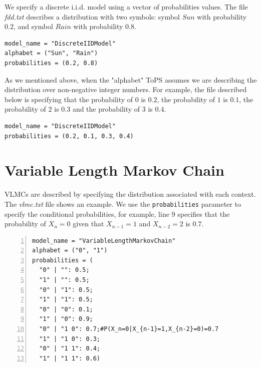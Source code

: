We specify a discrete i.i.d. model using a vector of probabilities values. The file \textit{fdd.txt} describes a distribution with two symbols: symbol $Sun$ with probability $0.2$, and symbol $Rain$ with probability $0.8$.

\begin{Verbatim}[frame=single,label=fdd.txt]
model_name = "DiscreteIIDModel"
alphabet = ("Sun", "Rain")
probabilities = (0.2, 0.8)
\end{Verbatim}


As we mentioned above, when the "alphabet" ToPS assumes we are describing the distribution over non-negative integer numbers. For example, the 
file described below is specifying that the probability of $0$ is $0.2$, the probability of $1$ is $0.1$, the probability of $2$ is $0.3$ and the probability of $3$ is $0.4$.

\begin{Verbatim}[frame=single]
model_name = "DiscreteIIDModel"
probabilities = (0.2, 0.1, 0.3, 0.4)
\end{Verbatim}




\section{Variable Length Markov Chain}

VLMCs are described by specifying  the distribution associated with each context. The  \textit{vlmc.txt} file shows an example. We use the \texttt{probabilities} parameter to specify the conditional probabilities, for example, line 9 specifies that the probability of $X_n = 0$ given that $X_{n-1} = 1$ and $X_{n-2} = 2$ is $0.7$.

\vspace{1em}
\begin{minipage}{\textwidth}
\begin{Verbatim}[frame=single,label={vlmc.txt},numbers=left]
model_name = "VariableLengthMarkovChain"
alphabet = ("0", "1")
probabilities = (
  "0" | "": 0.5; 
  "1" | "": 0.5;
  "0" | "1": 0.5;
  "1" | "1": 0.5;
  "0" | "0": 0.1;
  "1" | "0": 0.9;
  "0" | "1 0": 0.7;#P(X_n=0|X_{n-1}=1,X_{n-2}=0)=0.7
  "1" | "1 0": 0.3; 
  "0" | "1 1": 0.4;
  "1" | "1 1": 0.6)
\end{Verbatim}
\end{minipage}




